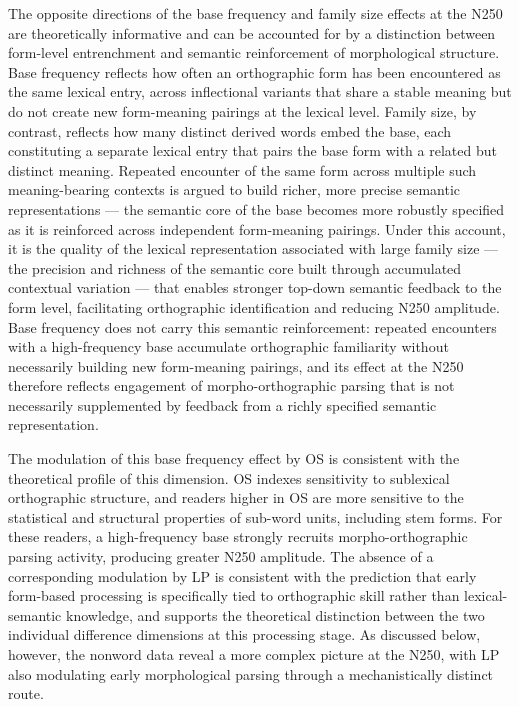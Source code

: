 \documentclass[utf8]{FrontiersinHarvard} %
\begin{document}
	The opposite directions of the base frequency and family size effects at the N250 are theoretically informative and can be accounted for by a distinction between form-level entrenchment and semantic reinforcement of morphological structure. Base frequency reflects how often an orthographic form has been encountered as the same lexical entry, across inflectional variants that share a stable meaning but do not create new form-meaning pairings at the lexical level. Family size, by contrast, reflects how many distinct derived words embed the base, each constituting a separate lexical entry that pairs the base form with a related but distinct meaning. Repeated encounter of the same form across multiple such meaning-bearing contexts is argued to build richer, more precise semantic representations \citep{bolgerContextVariationDefinitions2008, liLearningNovelComplex2026} --- the semantic core of the base becomes more robustly specified as it is reinforced across independent form-meaning pairings. Under this account, it is the quality of the lexical representation associated with large family size --- the precision and richness of the semantic core built through accumulated contextual variation --- that enables stronger top-down semantic feedback to the form level, facilitating orthographic identification and reducing N250 amplitude. Base frequency does not carry this semantic reinforcement: repeated encounters with a high-frequency base accumulate orthographic familiarity without necessarily building new form-meaning pairings, and its effect at the N250 therefore reflects engagement of morpho-orthographic parsing that is not necessarily supplemented by feedback from a richly specified semantic representation.
	
	The modulation of this base frequency effect by OS is consistent with the theoretical profile of this dimension. OS indexes sensitivity to sublexical orthographic structure, and readers higher in OS are more sensitive to the statistical and structural properties of sub-word units, including stem forms. For these readers, a high-frequency base strongly recruits morpho-orthographic parsing activity, producing greater N250 amplitude. The absence of a corresponding modulation by LP is consistent with the prediction that early form-based processing is specifically tied to orthographic skill rather than lexical-semantic knowledge, and supports the theoretical distinction between the two individual difference dimensions at this processing stage. As discussed below, however, the nonword data reveal a more complex picture at the N250, with LP also modulating early morphological parsing through a mechanistically distinct route.
	
\end{document}
